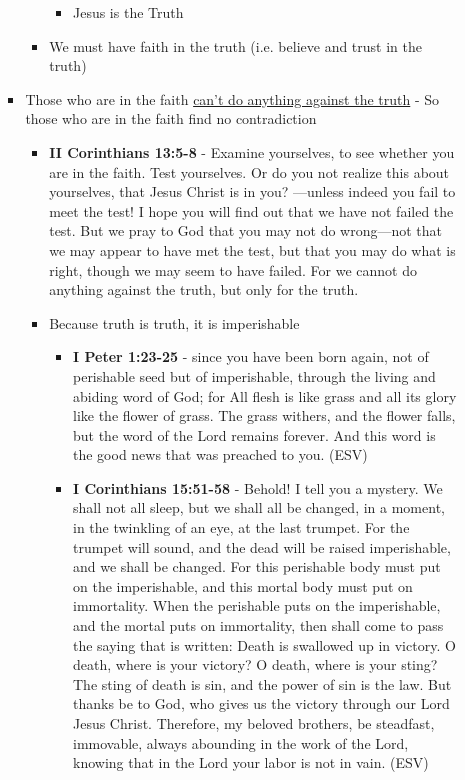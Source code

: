 \documentclass[11pt]{article}
\begin{document}
\begin{itemize}
\begin{itemize}
\begin{itemize}
\begin{itemize}
\begin{itemize}
\item Jesus is the Truth
\end{itemize}
\item We must have faith in the truth (i.e. believe and trust in the truth)
\end{itemize}
\item Those who are in the faith \uline{can't do anything against the truth} - So those who are in the faith find no contradiction
\begin{itemize}
\item \textbf{II Corinthians 13:5-8} - Examine yourselves, to see whether you are in the faith. Test yourselves. Or do you not realize this about yourselves, that Jesus Christ is in you? —unless indeed you fail to meet the test! I hope you will find out that we have not failed the test. But we pray to God that you may not do wrong—not that we may appear to have met the test, but that you may do what is right, though we may seem to have failed. For we cannot do anything against the truth, but only for the truth.
\item Because truth is truth, it is imperishable
\begin{itemize}
\item \textbf{I Peter 1:23-25} - since you have been born again, not of perishable seed but of imperishable, through the living and abiding word of God; for All flesh is like grass and all its glory like the flower of grass. The grass withers, and the flower falls, but the word of the Lord remains forever. And this word is the good news that was preached to you. (ESV)
\item \textbf{I Corinthians 15:51-58} - Behold! I tell you a mystery. We shall not all sleep, but we shall all be changed, in a moment, in the twinkling of an eye, at the last trumpet. For the trumpet will sound, and the dead will be raised imperishable, and we shall be changed. For this perishable body must put on the imperishable, and this mortal body must put on immortality. When the perishable puts on the imperishable, and the mortal puts on immortality, then shall come to pass the saying that is written: Death is swallowed up in victory. O death, where is your victory? O death, where is your sting? The sting of death is sin, and the power of sin is the law. But thanks be to God, who gives us the victory through our Lord Jesus Christ. Therefore, my beloved brothers, be steadfast, immovable, always abounding in the work of the Lord, knowing that in the Lord your labor is not in vain. (ESV)
\end{itemize}

\end{itemize}
\end{itemize}
\end{itemize}
\end{itemize}
\end{document}
